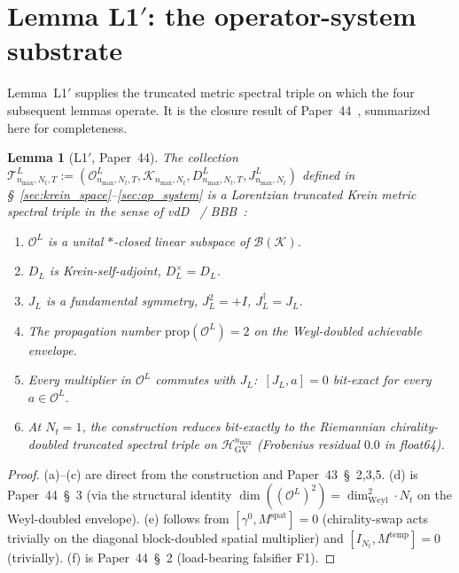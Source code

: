 \documentclass[11pt,a4paper]{article}
\theoremstyle{plain}
\newtheorem{lemma}[theorem]{Lemma}
\theoremstyle{definition}
\newcommand{\nmax}{n_{\max}}
\newcommand{\Nt}{N_{t}}
\newcommand{\Krein}{\mathcal{K}}
\newcommand{\Op}{\mathcal{O}}
\newcommand{\Tcal}{\mathcal{T}}
\newcommand{\Bcal}{\mathcal{B}}
\newcommand{\DL}{D_{L}}
\newcommand{\JL}{J_{L}}
\newcommand{\HGV}{\mathcal{H}_{\mathrm{GV}}}
\newcommand{\prop}{\mathrm{prop}}
\newcommand{\spat}{\mathrm{spat}}
\newcommand{\temp}{\mathrm{temp}}
\newcommand{\Weyl}{\mathrm{Weyl}}
\begin{document}
\section{Lemma L1$'$: the operator-system substrate}\label{sec:L1prime}

Lemma~L1$'$ supplies the truncated metric spectral triple on which
the four subsequent lemmas operate. It is the closure result of
Paper~44~\cite{paper44}, summarized here for completeness.

\begin{lemma}[L1$'$, Paper~44]\label{lem:L1prime}
The collection
$\Tcal^{L}_{\nmax,\Nt,T} := (\Op^{L}_{\nmax,\Nt,T},
\Krein_{\nmax,\Nt}, D^{L}_{\nmax,\Nt,T}, J^{L}_{\nmax,\Nt})$ defined in
\S~\ref{sec:krein_space}--\ref{sec:op_system} is a Lorentzian
truncated Krein metric spectral triple in the sense of
vdD~\cite{vandungen2016} / BBB~\cite{bizi_brouder_besnard2018}:
\begin{enumerate}
\item[(a)] $\Op^{L}$ is a unital $\ast$-closed linear subspace of
$\Bcal(\Krein)$.
\item[(b)] $\DL$ is Krein-self-adjoint, $\DL^{\times} = \DL$.
\item[(c)] $\JL$ is a fundamental symmetry, $\JL^{2} = +I$,
$\JL^{\dagger} = \JL$.
\item[(d)] The propagation number $\prop(\Op^{L}) = 2$ on the
Weyl-doubled achievable envelope.
\item[(e)] Every multiplier in $\Op^{L}$ commutes with $\JL$:\
$[\JL, a] = 0$ bit-exact for every $a \in \Op^{L}$.
\item[(f)] At $\Nt = 1$, the construction reduces bit-exactly to the
Riemannian chirality-doubled truncated spectral triple on
$\HGV^{\nmax}$ (Frobenius residual $0.0$ in float64).
\end{enumerate}
\end{lemma}

\begin{proof}
(a)--(c) are direct from the construction and Paper~43~\S~2,3,5.
(d) is Paper~44~\S~3 (via the structural identity $\dim((\Op^{L})^{2})
= \dim_{\Weyl}^{2} \cdot \Nt$ on the Weyl-doubled envelope).
(e) follows from $[\gamma^{0}, M^{\spat}] = 0$ (chirality-swap acts
trivially on the diagonal block-doubled spatial multiplier) and
$[I_{\Nt}, M^{\temp}] = 0$ (trivially). (f) is Paper~44~\S~2 (load-bearing
falsifier F1). \qedhere
\end{proof}
\end{document}
